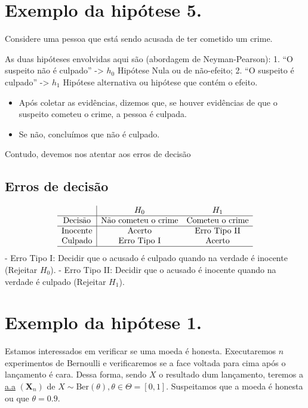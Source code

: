 \documentclass[
  letterpaper,
  DIV=11,
  numbers=noendperiod]{scrreprt}
\providecommand{\tightlist}{%
  \setlength{\itemsep}{0pt}\setlength{\parskip}{0pt}}\usepackage{longtable,booktabs,array}
\begin{document}
\section{Exemplo da hipótese 5.}\label{exemplo-da-hipuxf3tese-5.}

Considere uma pessoa que está sendo acusada de ter cometido um crime.

As duas hipóteses envolvidas aqui são (abordagem de Neyman-Pearson): 1.
``O suspeito não é culpado'' -\textgreater{} \(h_{0}\) Hipótese Nula ou
de não-efeito; 2. ``O suspeito é culpado'' -\textgreater{} \(h_{1}\)
Hipótese alternativa ou hipótese que contém o efeito.

\begin{itemize}
\tightlist
\item
  Após coletar as evidências, dizemos que, se houver evidências de que o
  suspeito cometeu o crime, a pessoa é culpada.
\item
  Se não, concluímos que não é culpado.
\end{itemize}

Contudo, devemos nos atentar aos erros de decisão

\subsection{Erros de decisão}\label{erros-de-decisuxe3o}

\[
\begin{array}{c|cc}
& H_{0} & H_{1} \\
\hline
\text{Decisão}  & \text{Não cometeu o crime}  & \text{Cometeu o crime}\\
\hline
\text{Inocente} & \text{Acerto} & \text{Erro Tipo II}\\
\text{Culpado} & \text{Erro Tipo I} & \text{Acerto}\\
\hline
\end{array}
\] - Erro Tipo I: Decidir que o acusado é culpado quando na verdade é
inocente (Rejeitar \(H_{0}\)). - Erro Tipo II: Decidir que o acusado é
inocente quando na verdade é culpado (Rejeitar \(H_{1}\)).

\section{Exemplo da hipótese 1.}\label{exemplo-da-hipuxf3tese-1.}

Estamos interessados em verificar se uma moeda é honesta. Executaremos
\(n\) experimentos de Bernoulli e verificaremos se a face voltada para
cima após o lançamento é cara. Dessa forma, sendo \(X\) o resultado dum
lançamento, teremos a \hyperref[sec-aa]{a.a} \((\pmb{X}_{n})\) de
\(X\sim \mathrm{Ber}(\theta), \theta \in \Theta = [0,1]\). Suspeitamos
que a moeda é honesta ou que \(\theta = 0.9\).
\end{document}

